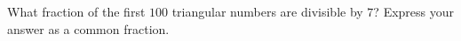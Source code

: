 What fraction of the first $100$ triangular numbers are divisible by $7$? Express your answer as a common fraction.
